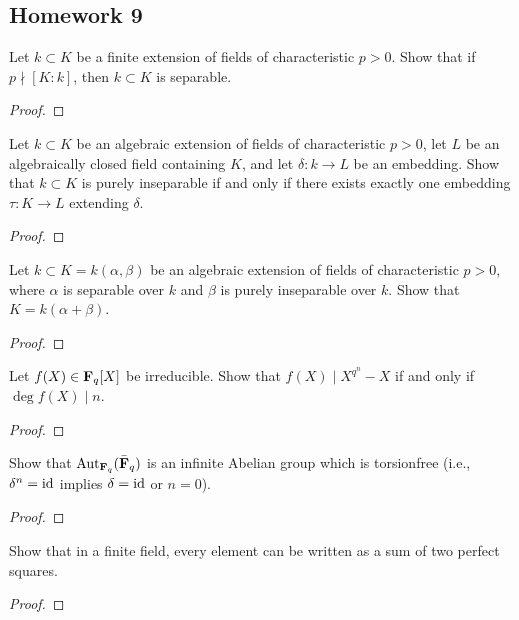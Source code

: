 \subsection{Homework 9}
\begin{problem}
  Let $k\subset K$ be a finite extension of fields of characteristic
  $p>0$. Show that if $p\nmid [K:k]$, then $k\subset K$ is separable.
\end{problem}
\begin{proof}
\end{proof}

\begin{problem}
  Let $k\subset K$ be an algebraic extension of fields of characteristic
  $p>0$, let $L$ be an algebraically closed field containing $K$, and let
  $\delta\colon k\to L$ be an embedding. Show that $k\subset K$ is purely
  inseparable if and only if there exists exactly one embedding
  $\tau\colon K\to L$ extending $\delta$.
\end{problem}
\begin{proof}
\end{proof}

\begin{problem}
  Let $k\subset K=k(\alpha,\beta)$ be an algebraic extension of fields of
  characteristic $p>0$, where $\alpha$ is separable over $k$ and $\beta$ is
  purely inseparable over $k$. Show that $K=k(\alpha+\beta)$.
\end{problem}
\begin{proof}
\end{proof}

\begin{problem}
  Let $f(X)\in\mathbf{F}_q[X]$ be irreducible. Show that $f(X)\mid X^{q^n}-X$ if
  and only if $\deg f(X)\mid n$.
\end{problem}
\begin{proof}
\end{proof}

\begin{problem}
  Show that $\operatorname{Aut}_{\mathbf{F}_q}(\bar{\mathbf{F}}_q)$ is an infinite Abelian group which
  is torsionfree (i.e., $\delta^n=\operatorname{id}$ implies $\delta=\operatorname{id}$ or $n=0$).
\end{problem}
\begin{proof}
\end{proof}

\begin{problem}
  Show that in a finite field, every element can be written as a sum of two
  perfect squares.
\end{problem}
\begin{proof}
\end{proof}

